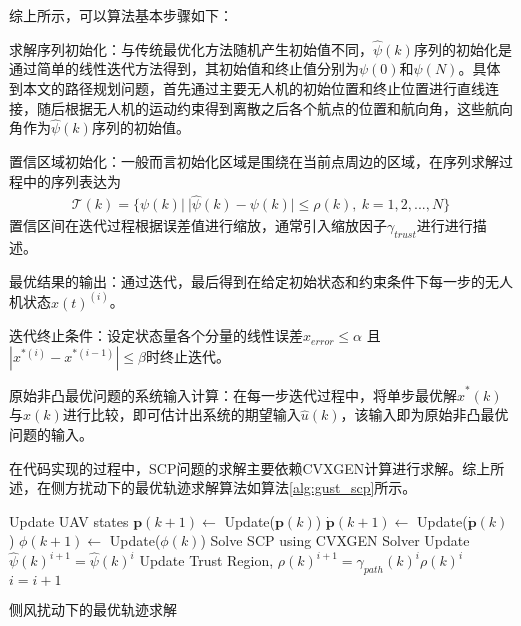 综上所示，可以算法基本步骤如下：
\begin{compactenum}
	\item 求解序列初始化：与传统最优化方法随机产生初始值不同，$\hat{\psi}(k)$序列的初始化是通过简单的线性迭代方法得到，其初始值和终止值分别为$\psi(0)$和$\psi(N)$。具体到本文的路径规划问题，首先通过主要无人机的初始位置和终止位置进行直线连接，随后根据无人机的运动约束得到离散之后各个航点的位置和航向角，这些航向角作为$\hat{\psi}(k)$序列的初始值。
	\item 置信区域初始化：一般而言初始化区域是围绕在当前点周边的区域，在序列求解过程中的序列表达为
	\begin{align}
		\mathcal{T}(k) = \{\psi(k)|\ |\hat{\psi}(k)-{\psi}(k)| \le \rho(k),\ k=1,2,...,N \}
	\end{align}
	置信区间在迭代过程根据误差值进行缩放，通常引入缩放因子$\gamma_{trust}$进行进行描述。
	
	\item 最优结果的输出：通过迭代，最后得到在给定初始状态和约束条件下每一步的无人机状态$\hat{x}(t)^{(i)}$。
	
	\item 迭代终止条件：设定状态量各个分量的线性误差$x_{error} \le \alpha$ 且$|x^{*(i)} - x^{*(i-1)} | \le \beta$时终止迭代。
	
	\item 原始非凸最优问题的系统输入计算：在每一步迭代过程中，将单步最优解$\hat{x}^{*}(k)$与$x(k)$进行比较，即可估计出系统的期望输入$\hat{u}(k)$，该输入即为原始非凸最优问题的输入。
\end{compactenum}
在代码实现的过程中，SCP问题的求解主要依赖CVXGEN\cite{mattingley2012cvxgen}计算进行求解。综上所述，在侧方扰动下的最优轨迹求解算法如算法\ref{alg:gust_scp}所示。

\begin{algorithm2e}
	\SetAlgoLined
	
	{
		Update UAV states \;
		$\mathbf{p}(k+1) \leftarrow$ Update($\mathbf{p}(k)$)\;
		$\dot{\mathbf{p}}(k+1) \leftarrow$ Update($\dot{\mathbf{p}}(k)$)\;
		${\phi}(k+1) \leftarrow$ Update(${\phi}(k)$)\;
		Solve SCP using CVXGEN Solver\;
		Update $\hat{\psi}(k)^{i+1} = \hat{\psi}(k)^{i} $\;
		Update Trust Region, $\rho(k)^{i+1} = \gamma_{path}(k)^{i} \rho(k)^{i}$ \;
		$i = i + 1$
	}
	\caption{侧风扰动下的最优轨迹求解}
	\label{alg:gust_scp}
\end{algorithm2e}

